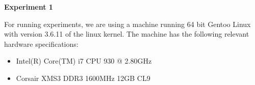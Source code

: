\textbf{Experiment 1} 

For running experiments, we are using a machine running 64 bit Gentoo Linux
with version 3.6.11 of the linux kernel. The machine has the following
relevant hardware specifications:
\begin{itemize}
    \item Intel(R) Core(TM) i7 CPU 930 @ 2.80GHz
    \item Corsair XMS3 DDR3 1600MHz 12GB CL9
\end{itemize}
